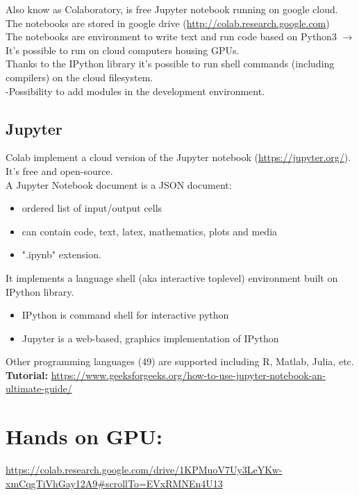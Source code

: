 Also know as Colaboratory, is free Jupyter notebook running on google cloud. The notebooks are stored in google drive (\url{http://colab.research.google.com})\\

The notebooks are environment to write
text and run code based on Python3 $\rightarrow$ It’s possible to run on cloud computers housing GPUs.\\

Thanks to the IPython library it’s possible to run shell commands (including compilers) on the cloud filesystem.\\

-Possibility to add modules in the
development environment.

\subsection{Jupyter}

Colab implement a cloud version of the Jupyter notebook (\url{https://jupyter.org/}). It’s free and open-source.\\
A Jupyter Notebook document is a JSON document:
\begin{itemize}
	\item ordered list of input/output cells
	\item can contain code, text, latex, mathematics, plots and media
	\item ".ipynb" extension.
\end{itemize}

It implements a language shell (aka interactive toplevel) environment built on IPython library.\\

\begin{itemize}
	\item IPython is command shell for interactive python
	\item Jupyter is a web-based, graphics implementation of IPython
\end{itemize}

Other programming languages (49) are supported including R, Matlab, Julia, etc.\\
\textbf{Tutorial:} \url{https://www.geeksforgeeks.org/how-to-use-jupyter-notebook-an-ultimate-guide/}

\section{Hands on GPU:}

\url{https://colab.research.google.com/drive/1KPMuoV7Uy3LeYKw-xmCqgTiVhGay12A9#scrollTo=EVxRMNEn4U13}



